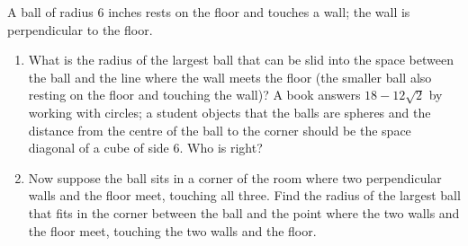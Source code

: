 A ball of radius $6$ inches rests on the floor and touches a wall; the wall is perpendicular to the floor.
\begin{enumerate}
\item[(a)] What is the radius of the largest ball that can be slid into the space between the ball and the line where the wall meets the floor (the smaller ball also resting on the floor and touching the wall)? A book answers $18-12\sqrt2$ by working with circles; a student objects that the balls are spheres and the distance from the centre of the ball to the corner should be the space diagonal of a cube of side $6$. Who is right?
\item[(b)] Now suppose the ball sits in a corner of the room where two perpendicular walls and the floor meet, touching all three. Find the radius of the largest ball that fits in the corner between the ball and the point where the two walls and the floor meet, touching the two walls and the floor.
\end{enumerate}
